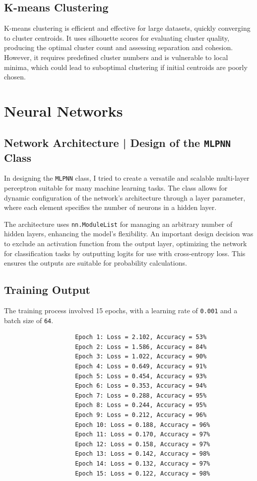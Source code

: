 \documentclass[11pt,a4paper]{article}
\begin{document}
\subsection*{K-means Clustering}
K-means clustering is efficient and effective for large datasets, quickly converging to cluster centroids.
It uses silhouette scores for evaluating cluster quality, producing the optimal cluster count and assessing
separation and cohesion. However, it requires predefined cluster numbers and is vulnerable to local minima,
which could lead to suboptimal clustering if initial centroids are poorly chosen.

\section{Neural Networks}
\subsection*{Network Architecture | Design of the \texttt{MLPNN} Class}

In designing the \texttt{MLPNN} class, I tried to create a versatile and scalable multi-layer perceptron suitable for many machine learning tasks.
The class allows for dynamic configuration of the network’s architecture through a layer parameter, where each element specifies the
number of neurons in a hidden layer.

The architecture uses \texttt{nn.ModuleList} for managing an arbitrary number of hidden layers,
enhancing the model's flexibility. An important design decision was to exclude an activation function from the output layer,
optimizing the network for classification tasks by outputting logits for use with cross-entropy loss.
This ensures the outputs are suitable for probability calculations.

\subsection{Training Output}
The training process involved 15 epochs, with a learning rate of \texttt{0.001} and a batch size of \texttt{64}.
\begin{verbatim}
                    Epoch 1: Loss = 2.102, Accuracy = 53%
                    Epoch 2: Loss = 1.586, Accuracy = 84%
                    Epoch 3: Loss = 1.022, Accuracy = 90%
                    Epoch 4: Loss = 0.649, Accuracy = 91%
                    Epoch 5: Loss = 0.454, Accuracy = 93%
                    Epoch 6: Loss = 0.353, Accuracy = 94%
                    Epoch 7: Loss = 0.288, Accuracy = 95%
                    Epoch 8: Loss = 0.244, Accuracy = 95%
                    Epoch 9: Loss = 0.212, Accuracy = 96%
                    Epoch 10: Loss = 0.188, Accuracy = 96%
                    Epoch 11: Loss = 0.170, Accuracy = 97%
                    Epoch 12: Loss = 0.158, Accuracy = 97%
                    Epoch 13: Loss = 0.142, Accuracy = 98%
                    Epoch 14: Loss = 0.132, Accuracy = 97%
                    Epoch 15: Loss = 0.122, Accuracy = 98%
\end{verbatim}
\newpage
\end{document}
